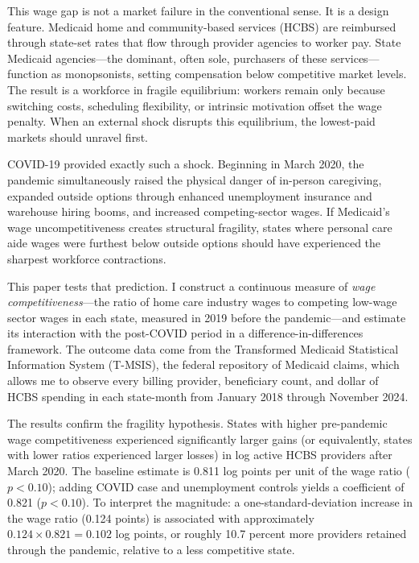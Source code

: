 \documentclass[12pt]{article}
\begin{document}
This wage gap is not a market failure in the conventional sense. It is a design feature. Medicaid home and community-based services (HCBS) are reimbursed through state-set rates that flow through provider agencies to worker pay. State Medicaid agencies---the dominant, often sole, purchasers of these services---function as monopsonists, setting compensation below competitive market levels. The result is a workforce in fragile equilibrium: workers remain only because switching costs, scheduling flexibility, or intrinsic motivation offset the wage penalty. When an external shock disrupts this equilibrium, the lowest-paid markets should unravel first.

COVID-19 provided exactly such a shock. Beginning in March 2020, the pandemic simultaneously raised the physical danger of in-person caregiving, expanded outside options through enhanced unemployment insurance and warehouse hiring booms, and increased competing-sector wages. If Medicaid's wage uncompetitiveness creates structural fragility, states where personal care aide wages were furthest below outside options should have experienced the sharpest workforce contractions.

This paper tests that prediction. I construct a continuous measure of \textit{wage competitiveness}---the ratio of home care industry wages to competing low-wage sector wages in each state, measured in 2019 before the pandemic---and estimate its interaction with the post-COVID period in a difference-in-differences framework. The outcome data come from the Transformed Medicaid Statistical Information System (T-MSIS), the federal repository of Medicaid claims, which allows me to observe every billing provider, beneficiary count, and dollar of HCBS spending in each state-month from January 2018 through November 2024.

The results confirm the fragility hypothesis. States with higher pre-pandemic wage competitiveness experienced significantly larger gains (or equivalently, states with lower ratios experienced larger losses) in log active HCBS providers after March 2020. The baseline estimate is 0.811 log points per unit of the wage ratio ($p < 0.10$); adding COVID case and unemployment controls yields a coefficient of 0.821 ($p < 0.10$). To interpret the magnitude: a one-standard-deviation increase in the wage ratio (0.124 points) is associated with approximately $0.124 \times 0.821 = 0.102$ log points, or roughly 10.7 percent more providers retained through the pandemic, relative to a less competitive state.
\end{document}
